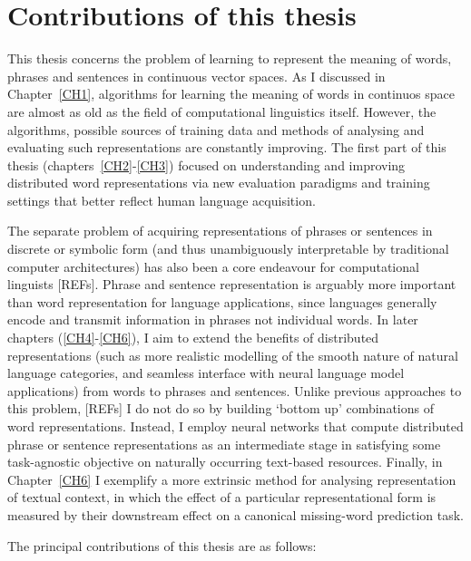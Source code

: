 
\section{Contributions of this thesis}

This thesis concerns the problem of learning to represent the meaning of words, phrases and sentences in continuous vector spaces. As I discussed in Chapter~\ref{CH1}, algorithms for learning the meaning of words in continuos space are almost as old as the field of computational linguistics itself. However, the algorithms, possible sources of training data and methods of analysing and evaluating such representations are constantly improving. The first part of this thesis (chapters~\ref{CH2}-\ref{CH3}) focused on understanding and improving distributed word representations via new evaluation paradigms and training settings that better reflect human language acquisition.

The separate problem of acquiring representations of phrases or sentences in discrete or symbolic form (and thus unambiguously interpretable by traditional computer architectures) has also been a core endeavour for computational linguists [REFs]. Phrase and sentence representation is arguably more important than word representation for language applications, since languages generally encode and transmit information in phrases not individual words. In later chapters (\ref{CH4}-\ref{CH6}), I aim to extend the benefits of distributed representations (such as more realistic modelling of the smooth nature of natural language categories, and seamless interface with neural language model applications) from words to phrases and sentences. Unlike previous approaches to this problem, [REFs] I do not do so by building `bottom up' combinations of word representations. Instead, I employ neural networks that compute distributed phrase or sentence representations as an intermediate stage in satisfying some task-agnostic objective on naturally occurring text-based resources. Finally, in Chapter~\ref{CH6} I exemplify a more extrinsic method for analysing representation of textual context, in which the effect of a particular representational form is measured by their downstream effect on a canonical missing-word prediction task.   

The principal contributions of this thesis are as follows:

